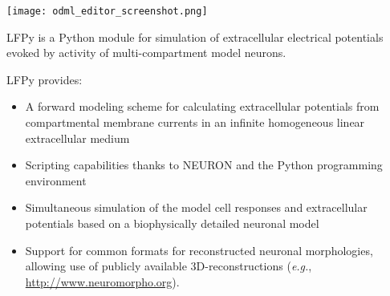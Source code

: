 \begin{multicols}{3}
\vspace{0.5em}
\texttt{[image: odml\_editor\_screenshot.png]}





\vspace{0.5em}                  %
LFPy is a Python module for simulation of extracellular electrical
potentials evoked by activity of multi-compartment model neurons.

LFPy provides:
\begin{itemize}[nolistsep, topsep=0em, leftmargin=1pc]
\item A forward modeling scheme for calculating extracellular
  potentials from compartmental membrane currents in an infinite
  homogeneous linear extracellular medium
\item Scripting capabilities thanks to NEURON and the
  Python programming environment
\item Simultaneous simulation of the model cell responses and
  extracellular potentials based on a biophysically detailed neuronal
  model
\item Support for common formats for reconstructed neuronal
  morphologies, allowing use of publicly available 3D-reconstructions
  (\emph{e.g.}, \url{http://www.neuromorpho.org}).
\end{itemize}



%



\end{multicols}
